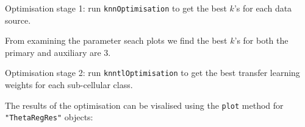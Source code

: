 Optimisation stage 1: run \texttt{knnOptimisation} to get the best
$k$'s for each data source.

\begin{knitrout}
\color{fgcolor}\begin{kframe}
\begin{alltt}
 \hlkwb{<-}   \hlstd{=} \hlstd{)}
 \hlkwb{<-}   \hlstd{=} \hlstd{)}
\end{alltt}
\end{kframe}
\end{knitrout}

From examining the parameter seach plots we find the best $k$'s for
both the primary and auxiliary are 3.

Optimisation stage 2: run \texttt{knntlOptimisation} to get the best
transfer learning weights for each sub-cellular class.

\begin{knitrout}
\color{fgcolor}\begin{kframe}
\begin{alltt}
 \hlkwb{<-} \hlstd{(}\hlstd{,}  \hlstd{=} \hlstd{)}

 \hlkwb{<-} 
                            \hlstd{=} \hlstd{,}
                            \hlstd{=} \hlstd{,}
                            \hlstd{=} \hlstd{,}
                            \hlstd{=} \hlstd{,}  \hlstd{=} \hlstd{(}\hlstd{,} \hlstd{),}
                            
\end{alltt}
\end{kframe}
\end{knitrout}

The results of the optimisation can be visalised using the \texttt{plot}
method for \texttt{"ThetaRegRes"} objects:



